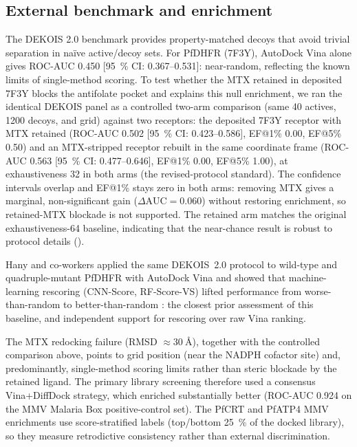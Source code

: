 \documentclass[11pt,a4paper]{article}
\begin{document}
	\subsection{External benchmark and enrichment}\label{sec:sm_val_dekois}
	
	
	The DEKOIS 2.0 benchmark \cite{Bauer2013} provides property-matched decoys that avoid trivial separation in na\"ive active/decoy sets. For PfDHFR (7F3Y), AutoDock Vina alone gives ROC-AUC \num{0.450} [\qty{95}{\percent} CI: \numrange{0.367}{0.531}]: near-random, reflecting the known limits of single-method scoring. To test whether the MTX retained in deposited 7F3Y blocks the antifolate pocket and explains this null enrichment, we ran the identical DEKOIS panel as a controlled two-arm comparison (same \num{40} actives, \num{1200} decoys, and grid) against two receptors: the deposited 7F3Y receptor with MTX retained (ROC-AUC \num{0.502} [\qty{95}{\percent} CI: \numrange{0.423}{0.586}], EF@1\% \num{0.00}, EF@5\% \num{0.50}) and an MTX-stripped receptor rebuilt in the same coordinate frame (ROC-AUC \num{0.563} [\qty{95}{\percent} CI: \numrange{0.477}{0.646}], EF@1\% \num{0.00}, EF@5\% \num{1.00}), at exhaustiveness \num{32} in both arms (the revised-protocol standard). The confidence intervals overlap and EF@1\% stays zero in both arms: removing MTX gives a marginal, non-significant gain ($\Delta\mathrm{AUC} = \num{+0.060}$) without restoring enrichment, so retained-MTX blockade is not supported. The retained arm matches the original exhaustiveness-\num{64} baseline, indicating that the near-chance result is robust to protocol details ().
	
	Hany and co-workers applied the same DEKOIS~2.0 protocol to wild-type and quadruple-mutant PfDHFR with AutoDock Vina and showed that machine-learning rescoring (CNN-Score, RF-Score-VS) lifted performance from worse-than-random to better-than-random \cite{hany2025dekois}: the closest prior assessment of this baseline, and independent support for rescoring over raw Vina ranking.
	
	The MTX redocking failure (RMSD $\approx \qty{30}{\angstrom}$), together with the controlled comparison above, points to grid position (near the NADPH cofactor site) and, predominantly, single-method scoring limits rather than steric blockade by the retained ligand. The primary library screening therefore used a consensus Vina+DiffDock strategy, which enriched substantially better (ROC-AUC \num{0.924} on the MMV Malaria Box positive-control set). The PfCRT and PfATP4 MMV enrichments use score-stratified labels (top/bottom \qty{25}{\percent} of the docked library), so they measure retrodictive consistency rather than external discrimination.
	
\end{document}
